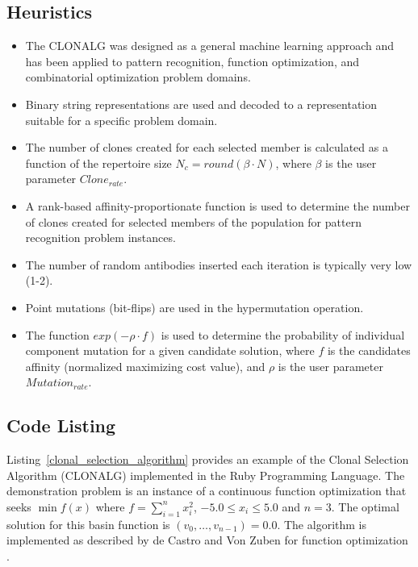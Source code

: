 \subsection{Heuristics}
\begin{itemize}
	\item The CLONALG was designed as a general machine learning approach and has been applied to pattern recognition, function optimization, and combinatorial optimization problem domains.
	\item Binary string representations are used and decoded to a representation suitable for a specific problem domain.
	\item The number of clones created for each selected member is calculated as a function of the repertoire size $N_c=round(\beta \cdot N)$, where $\beta$ is the user parameter $Clone_{rate}$. 
	\item A rank-based affinity-proportionate function is used to determine the number of clones created for selected members of the population for pattern recognition problem instances.
	\item The number of random antibodies inserted each iteration is typically very low (1-2).
	\item Point mutations (bit-flips) are used in the hypermutation operation.
	\item The function $exp(-\rho \cdot f)$ is used to determine the probability of individual component mutation for a given candidate solution, where $f$ is the candidates affinity (normalized maximizing cost value), and $\rho$ is the user parameter $Mutation_{rate}$.
\end{itemize}

\subsection{Code Listing}
Listing~\ref{clonal_selection_algorithm} provides an example of the Clonal Selection Algorithm (CLONALG) implemented in the Ruby Programming Language.
The demonstration problem is an instance of a continuous function optimization that seeks $\min f(x)$ where $f=\sum_{i=1}^n x_{i}^2$, $-5.0\leq x_i \leq 5.0$ and $n=3$. The optimal solution for this basin function is $(v_0,\ldots,v_{n-1})=0.0$.
The algorithm is implemented as described by de Castro and Von Zuben for function optimization \cite{Castro2002a}.

